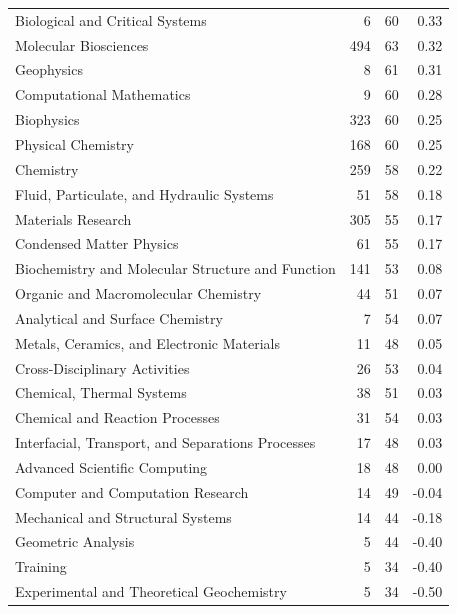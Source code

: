 \documentclass[10pt, conference, compsocconf]{IEEEtran}
\begin{document}
\begin{table}[!htb]
{\begin{tabular}{p{}rrr}
Biological and Critical Systems & 6 &   60 &  0.33 \\
Molecular Biosciences &  494 &    63 &  0.32 \\
Geophysics &  8 &   61 &  0.31 \\
Computational Mathematics &   9 &   60 &  0.28 \\
Biophysics &  323 &    60 &  0.25 \\
Physical Chemistry &  168 &    60 &  0.25 \\
Chemistry &   259 &    58 &  0.22 \\
Fluid, Particulate, and Hydraulic Systems &   51 &  58 & 0.18 \\
Materials Research &  305 &    55 &  0.17 \\
Condensed Matter Physics &    61 &  55 &  0.17 \\
Biochemistry and Molecular Structure and Function &   141 &    53 &  0.08 \\
Organic and Macromolecular Chemistry &   44 &  51 &  0.07 \\
Analytical and Surface Chemistry &    7 &   54 &  0.07 \\
Metals, Ceramics, and Electronic Materials &  11 &  48 & 0.05 \\
Cross-Disciplinary Activities &  26 &  53 &  0.04 \\
Chemical, Thermal Systems &   38 &  51 &  0.03 \\
Chemical and Reaction Processes & 31 &  54 &  0.03 \\
Interfacial, Transport, and Separations Processes &   17 &  48 &  0.03 \\
Advanced Scientific Computing &  18 &  48 &  0.00 \\
Computer and Computation Research &   14 &  49 &  -0.04 \\
Mechanical and Structural Systems &   14 &  44 &  -0.18 \\
Geometric Analysis &  5 &   44 &  -0.40 \\
Training &    5 &   34 &  -0.40 \\
Experimental and Theoretical Geochemistry &   5 &   34 & -0.50 \\
\end{tabular}
}
\end{table}

 
%
% 

 
\end{document}
